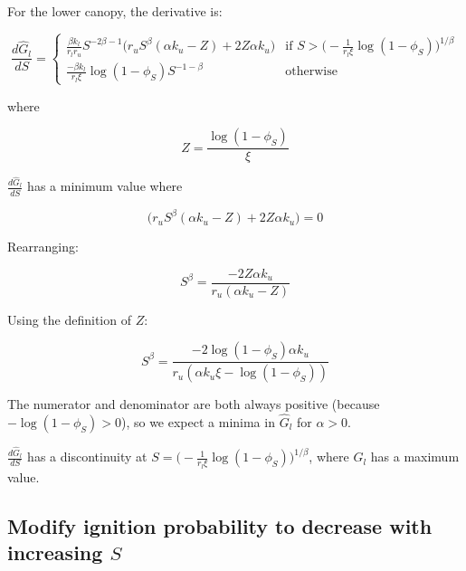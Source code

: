 \documentclass{article}
\begin{document}
    
    For the lower canopy, the derivative is:
    
    \begin{equation}
    \frac{ d\hat{G}_l }{dS} =
        \begin{cases}
    	  \frac{\beta  {k_l} }{{r_l} {r_u}} S^{-2 \beta -1}
    \big( {r_u} S^{\beta }(\alpha  {k_u}  - Z) +2 Z \alpha  {k_u}
       \big)
    	  & \text{if  } S > \big( - \frac{1}{r_l \xi }\log (1 - \phi_S)\big)^{1/\beta}
    		\\[10pt]
            \frac{-\beta k_l }{r_l \xi} \log(1-\phi_S) S^{-1-\beta} & \text{otherwise}
        \end{cases}
    \end{equation}
    
    
    where
    
    \begin{equation}
    Z = \frac{\log({1-\phi_S})}{\xi}
    \end{equation}
    
     $\frac{d \hat{G}_l}{dS}$  has a minimum value where
    
      \begin{equation}
      \big( {r_u} S^{\beta }(\alpha  {k_u}  - Z) +2 Z \alpha  {k_u}
       \big) = 0
    \end{equation}
    
    Rearranging:
    
      \begin{equation}
     S^{\beta } = \frac{-2 Z \alpha  {k_u} }{{r_u}(\alpha  {k_u}  - Z)  }
    \end{equation}
    
    Using the definition of $Z$:
    
      \begin{equation}
     S^{\beta } = \frac{-2 {\log({1-\phi_S})} \alpha  {k_u} }{{r_u}(\alpha  {k_u} \xi - {\log({1-\phi_S})})  }
    \end{equation}
    
    The numerator and denominator are both always positive (because $- \log(1-\phi_S) > 0$), so we expect a minima in $\hat G_l$ for $\alpha > 0$.
    
     $\frac{d \hat{G}_l}{dS}$ has a discontinuity at  $ S = \big( - \frac{1}{r_l \xi }\log (1 - \phi_S)\big)^{1/\beta}$, where $G_l$ has a maximum value.
    

\subsection*{Modify ignition probability to decrease with increasing $S$}
\end{document}
